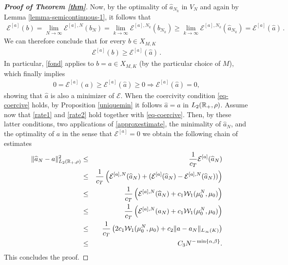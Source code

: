 \begin{proof}[\normalfont\bf Proof of Theorem \ref{thm}]
	Now, by the optimality of $\widehat a_{N_k}$ in $V_N$ and again by Lemma \ref{lemma-semicontinuous-1}, it follows that
	\begin{align*}
		\mathcal E^{[a]} (b)=\lim_{N\rightarrow\infty}\mathcal E^{[a],N}(b_N)
			= \lim_{k \rightarrow\infty}\mathcal E^{[a],N_k}(b_{N_k})
			\geq\lim_{k \rightarrow\infty}\mathcal E^{[a],N_k}(\widehat a_{N_k})
			= \mathcal E^{[a]} (\widehat a)\,.
	\end{align*}
	We can therefore conclude that for every $b \in X_{M,K}$
	\begin{align}\label{fond}
		 \mathcal E^{[a]} (b)\geq \mathcal E^{[a]} (\widehat a)\,.
	\end{align}
 In particular, \eqref{fond} applies to $b=a\in X_{M,K}$ (by the particular choice of $M$), which finally implies
	\begin{align*}
		0=\mathcal E^{[a]} (a)\geq \mathcal E^{[a]} (\widehat a)\geq 0\Longrightarrow \mathcal E^{[a]} (\widehat a)=0,
	\end{align*}
	showing that $\widehat a$ is also a minimizer of $\mathcal E$. When the coercivity condition \eqref{eq-coercive} holds, by Proposition \ref{uniquemin} it follows $\widehat a=a$ in  $L_2(\mathbb{R}_+,\rho)$.
Assume now that \eqref{rate1} and \eqref{rate2} hold together with  \eqref{eq-coercive}. Then, by these latter conditions, two applications of \eqref{approxestimate}, the minimality of $\widehat a_N$, and the optimality of
$a$ in the sense that $\mathcal E^{[a]}=0$ we obtain the following chain of estimates
\begin{eqnarray*}
\| \widehat a_N - a \|_{L_2(\mathbb{R}_+,\rho)}^2 &\leq& \frac{1}{c_T}  \mathcal E^{[a]}(\widehat a_N) \\
&\leq& \frac{1}{c_T} \left ( \mathcal E^{[a],N}(\widehat a_N) + ( \mathcal E^{[a]}(\widehat a_N)- \mathcal E^{[a],N}(\widehat a_N))  \right )\\
&\leq & \frac{1}{c_T} \left (\mathcal E^{[a],N}(\widehat a_N) +  c_1 \mathcal W_1(\mu_0^N,\mu_0) \right ) \\
&\leq &\frac{1}{c_T} \left (\mathcal E^{[a],N}(a_N) +  c_1 \mathcal W_1(\mu_0^N,\mu_0) \right ) \\
&\leq &\frac{1}{c_T} \left (2 c_1 \mathcal W_1(\mu_0^N,\mu_0) + c_2 \| a - a_N \|_{L_\infty(K)} \right ) \\
&\leq & C_3  N^{-\min \{\alpha,\beta\}}.
\end{eqnarray*} 
This concludes the proof.
\end{proof}